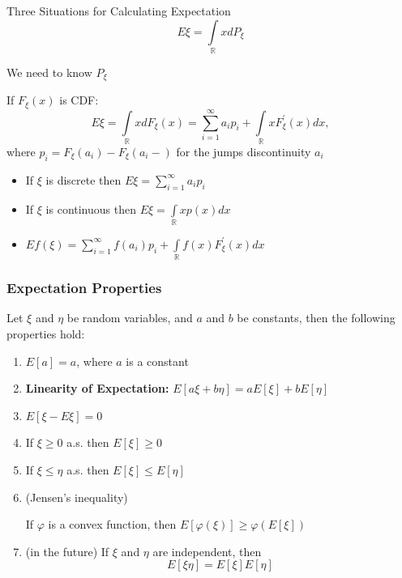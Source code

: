 \documentclass[fullscreen=true, bookmarks=true, hyperref={pdfencoding=unicode}]{beamer}
\begin{document}
\begin{frame}{Three Situations for Calculating Expectation}
  $$E\xi = \int\limits_{\mathbb{R}} x d P_\xi$$

  We need to know $P_\xi$
    
  \pause
  If $F_\xi(x)$ is CDF: 
  $$E\xi = \int\limits_{\mathbb{R}} x d F_\xi(x) = 
    \sum\limits_{i=1}^\infty a_ip_i + \int\limits_{\mathbb{R}} x F^\prime_\xi(x) dx,$$
    where $p_i = F_\xi(a_i) - F_\xi(a_i-)$ for the jumps discontinuity $a_i$
  
  \begin{itemize}
    \pause\item If $\xi$ is discrete then $E\xi = \sum\limits_{i=1}^\infty a_ip_i$
    \pause\item If $\xi$ is continuous then $E\xi = \int\limits_{\mathbb{R}} x p(x) dx$
    \pause\item $Ef(\xi) = \sum\limits_{i=1}^\infty f(a_i)p_i + 
    \int\limits_{\mathbb{R}} f(x) F^\prime_\xi(x) dx$
  \end{itemize}

\end{frame}


\begin{frame}
  \frametitle{Expectation Properties}
 
    Let $\xi$ and $\eta$ be random variables, and $a$ and $b$ be constants, then the following properties hold:
    
    \begin{enumerate}
      \item $E[a] = a$, where $a$ is a constant
      \item \textbf{Linearity of Expectation:} $E[a\xi + b\eta] = aE[\xi] + bE[\eta]$
      \pause\item $E[\xi - E\xi] = 0$
      \pause\item If $\xi \geq 0$ a.s. then $E[\xi] \geq 0$
      \item If $\xi \leq \eta$ a.s. then $E[\xi] \leq E[\eta]$
      \item (Jensen's inequality) 
      
      If $\varphi$ is a convex function, then $E[\varphi(\xi)] \geq \varphi(E[\xi])$
      \pause\item (in the future) If $\xi$ and $\eta$ are independent, 
      then $$E[\xi\eta] = E[\xi]E[\eta]$$
    \end{enumerate}
    
\end{frame}
\end{document}
